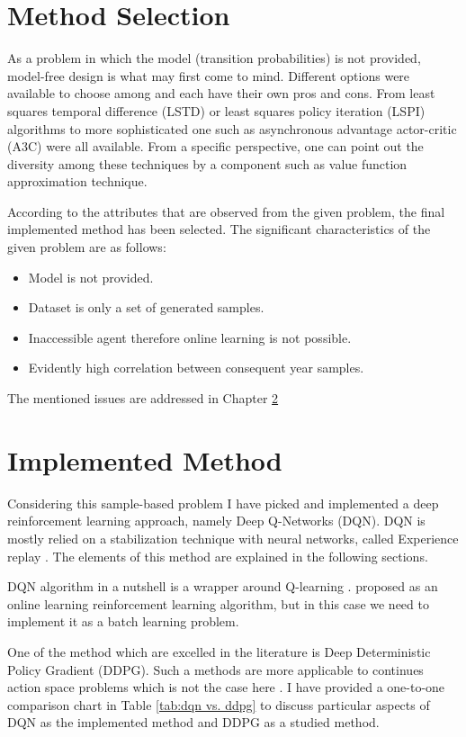 \documentclass[12pt]{report}
\begin{document}
\chapter{Method Selection}
As a problem in which the model (transition probabilities) is not provided, model-free design is what may first come to mind. Different options were available to choose among and each have their own pros and cons. From least squares temporal difference (LSTD) \cite{Bradtke1996} or least squares policy iteration (LSPI) \cite{Lagoudakis2003} algorithms to more sophisticated one such as asynchronous advantage actor-critic (A3C) \cite{Mnih2016b} were all available. From a specific perspective, one can point out the diversity among these techniques by a component such as value function approximation technique.

According to the attributes that are observed from the given problem, the final implemented method has been selected. The significant characteristics of the given problem are as follows:
\begin{itemize}
    \item Model is not provided.
    \item Dataset is only a set of generated samples.
    \item Inaccessible agent therefore online learning is not possible.
    \item Evidently high correlation between consequent year samples.
\end{itemize}

The mentioned issues are addressed in Chapter \ref{chap: implemented method}

\chapter{Implemented Method}
\label{chap: implemented method}
Considering this sample-based problem I have picked and implemented a deep reinforcement learning approach, namely Deep Q-Networks (DQN). DQN is mostly relied on a stabilization technique with neural networks, called Experience replay \cite{Mnih2015}. The elements of this method are explained in the following sections.

DQN algorithm in a nutshell is a wrapper around Q-learning \cite{Watkins1992}. proposed as an online learning reinforcement learning algorithm, but in this case we need to implement it as a batch learning problem.

One of the method which are excelled in the literature is Deep Deterministic Policy Gradient (DDPG). Such a methods are more applicable to continues action space problems which is not the case here \cite{Lillicrap2015}. I have provided a one-to-one comparison chart in Table \ref{tab:dqn vs. ddpg} to discuss particular aspects of DQN as the implemented method and DDPG as a studied method.
\end{document}
